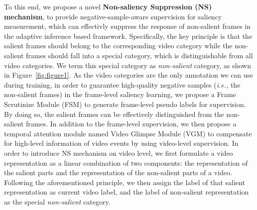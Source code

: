 \documentclass[runningheads]{llncs}
\newcommand{\figref}[1]{Figure~\ref{#1}}
\begin{document}
To this end, we propose a novel \textbf{Non-saliency Suppression (NS) mechanism}, to provide negative-sample-aware supervision for saliency measurement, which can effectivly suppress the response of non-salient frames in the adaptive inference based framework. 
Specifically, the key principle is that the salient frames should belong to the corresponding video category while the non-salient frames should fall into a special category, which is distinguishable from all video categories. We term this special category as \textit{non-salient} category, as shown in \figref{fig:figure1}. As the video categories are the only annotation we can use during training, in order to guarantee high-quality negative samples (\textit{i.e.,} the non-salient frames) in the frame-level saliency learning, we propose a Frame Scrutinize Module (FSM) to generate frame-level pseudo labels for supervision. 
By doing so, the salient frames can be effectively distinguished from the non-salient frames. In addition to the frame-level supervision, we then propose a temporal attention module named Video Glimpse Module (VGM) to compensate for high-level information of video events by using video-level supervision. In order to introduce NS mechanism on video level, we first formulate a video representation as a linear combination of two components: the representation of the salient parts and the representation of the non-salient parts of a video. Following the aforementioned principle, we then assign the label of that salient representation as current video label, and the label of non-salient representation as the special \emph{non-salient} category.
\end{document}
